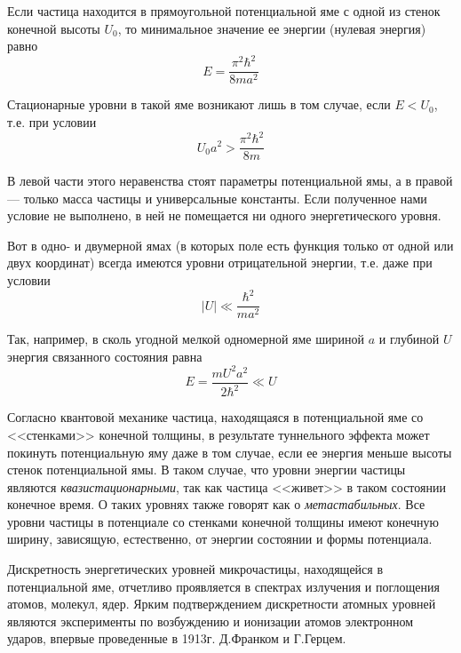 \documentclass[a4paper, 12pt]{article}
\begin{document}
Если частица находится в прямоугольной потенциальной яме с одной из
стенок конечной высоты $U_0$, то минимальное значение ее энергии
(нулевая энергия) равно
\begin{equation}
    E = \frac{\pi^2 \hbar^2}{8ma^2}
    \label{eq:4}
\end{equation}

Стационарные уровни в такой яме возникают лишь в том случае, если $E <
U_0$, т.е. при условии
\begin{equation}
    U_0 a^2 > \frac{\pi^2 \hbar^2}{8m}
    \label{eq:5}
\end{equation}

В левой части этого неравенства стоят параметры потенциальной ямы, а в
правой --- только масса частицы и универсальные константы. Если
полученное нами условие не выполнено, в ней не помещается ни одного
энергетического уровня.

Вот в одно- и двумерной ямах (в которых поле есть функция только от
одной или двух координат) всегда имеются уровни отрицательной энергии,
т.е. даже при условии
\begin{equation}
    |U| \ll \frac{\hbar^2}{ma^2}
    \label{eq:6}
\end{equation}

Так, например, в сколь угодной мелкой одномерной яме шириной $a$ и
глубиной $U$ энергия связанного состояния равна
\begin{equation}
    E = \frac{mU^2a^2}{2 \hbar^2} \ll U
    \label{eq:7}
\end{equation}

Согласно квантовой механике частица, находящаяся в потенциальной яме
со <<стенками>> конечной толщины, в результате туннельного эффекта
может покинуть потенциальную яму даже в том случае, если ее энергия
меньше высоты стенок потенциальной ямы. В таком случае, что уровни
энергии частицы являются \emph{квазистационарными}, так как частица
<<живет>> в таком состоянии конечное время. О таких уровнях также
говорят как о \emph{метастабильных}. Все уровни частицы в потенциале со
стенками конечной толщины имеют конечную ширину, зависящую,
естественно, от энергии состоянии и формы потенциала.

Дискретность энергетических уровней микрочастицы, находящейся в
потенциальной яме, отчетливо проявляется в спектрах излучения и
поглощения атомов, молекул, ядер. Ярким подтверждением дискретности
атомных уровней являются эксперименты по возбуждению и ионизации
атомов электронном ударов, впервые проведенные в 1913г. Д.Франком и
Г.Герцем. 
\end{document}
